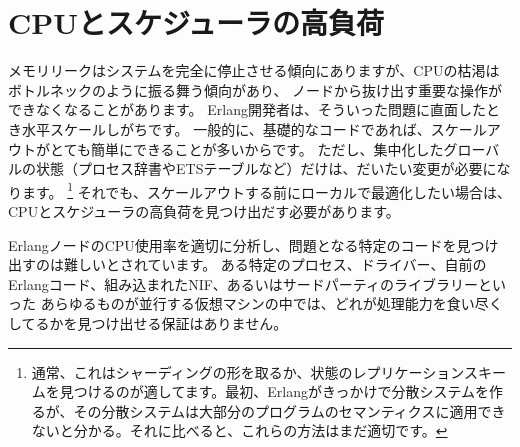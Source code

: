 \chapter{CPUとスケジューラの高負荷}
\label{chap:cpu-hogs}

メモリリークはシステムを完全に停止させる傾向にありますが、CPUの枯渇はボトルネックのように振る舞う傾向があり、
ノードから抜け出す重要な操作ができなくなることがあります。
Erlang開発者は、そういった問題に直面したとき水平スケールしがちです。
一般的に、基礎的なコードであれば、スケールアウトがとても簡単にできることが多いからです。
ただし、集中化したグローバルの状態（プロセス辞書やETSテーブルなど）だけは、だいたい変更が必要になります。
\footnote{通常、これはシャーディングの形を取るか、状態のレプリケーションスキームを見つけるのが適してます。最初、Erlangがきっかけで分散システムを作るが、その分散システムは大部分のプログラムのセマンティクスに適用できないと分かる。それに比べると、これらの方法はまだ適切です。}
それでも、スケールアウトする前にローカルで最適化したい場合は、CPUとスケジューラの高負荷を見つけ出だす必要があります。

ErlangノードのCPU使用率を適切に分析し、問題となる特定のコードを見つけ出すのは難しいとされています。
ある特定のプロセス、ドライバー、自前のErlangコード、組み込まれたNIF、あるいはサードパーティのライブラリーといった
あらゆるものが並行する仮想マシンの中では、どれが処理能力を食い尽くしてるかを見つけ出せる保証はありません。

